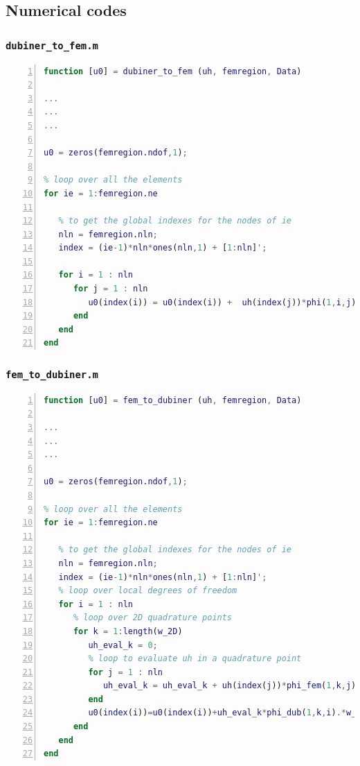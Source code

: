 \documentclass[a4paper,11pt]{article}
\begin{document}
\subsection{Numerical codes}
\subsubsection{\texttt{dubiner\_to\_fem.m}}\label{dub_to_fem}
\begin{lstlisting}[language=Matlab,basicstyle=\small, numbers=left, numberstyle=\tiny,  name = dubiner_to_fem.m, frame=single]
function [u0] = dubiner_to_fem (uh, femregion, Data)  
	
...
...
...
	
u0 = zeros(femregion.ndof,1);
	
% loop over all the elements
for ie = 1:femregion.ne
	
   % to get the global indexes for the nodes of ie 
   nln = femregion.nln;
   index = (ie-1)*nln*ones(nln,1) + [1:nln]';
	
   for i = 1 : nln
      for j = 1 : nln
         u0(index(i)) = u0(index(i)) +  uh(index(j))*phi(1,i,j);
      end
   end
end
\end{lstlisting} 

\subsubsection{\texttt{fem\_to\_dubiner.m}}\label{fem_to_dub}
\begin{lstlisting}[language=Matlab,basicstyle=\small, numbers=left, numberstyle=\tiny,  name = fem_to_dubiner.m, frame=single]
function [u0] = fem_to_dubiner (uh, femregion, Data)
	
...
...
...
	
u0 = zeros(femregion.ndof,1);
	
% loop over all the elements
for ie = 1:femregion.ne
	
   % to get the global indexes for the nodes of ie 
   nln = femregion.nln;
   index = (ie-1)*nln*ones(nln,1) + [1:nln]';
   % loop over local degrees of freedom
   for i = 1 : nln
      % loop over 2D quadrature points
      for k = 1:length(w_2D) 
         uh_eval_k = 0;
         % loop to evaluate uh in a quadrature point
         for j = 1 : nln
            uh_eval_k = uh_eval_k + uh(index(j))*phi_fem(1,k,j);
         end
         u0(index(i))=u0(index(i))+uh_eval_k*phi_dub(1,k,i).*w_2D(k);
      end
   end    
end
\end{lstlisting}
\end{document}
